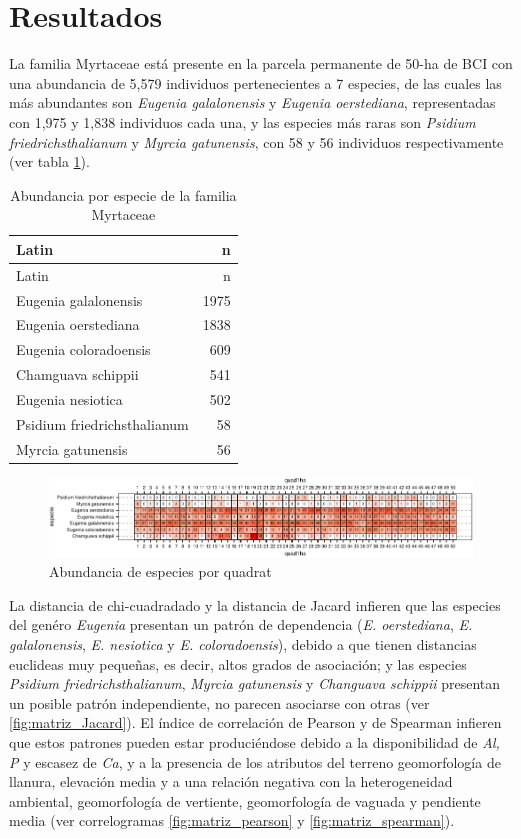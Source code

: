 \documentclass[11pt,]{article}
\begin{document}
\section{Resultados}\label{resultados}

La familia Myrtaceae está presente en la parcela permanente de 50-ha de
BCI con una abundancia de 5,579 individuos pertenecientes a 7 especies,
de las cuales las más abundantes son \emph{Eugenia galalonensis} y
\emph{Eugenia oerstediana}, representadas con 1,975 y 1,838 individuos
cada una, y las especies más raras son \emph{Psidium
friedrichsthalianum} y \emph{Myrcia gatunensis}, con 58 y 56 individuos
respectivamente (ver tabla \ref{tab:abun_sp}).

\begin{longtable}[]{@{}lr@{}}
\caption{\label{tab:abun_sp}Abundancia por especie de la familia
Myrtaceae}\tabularnewline
\toprule
Latin & n\tabularnewline
\midrule
\endfirsthead
\toprule
Latin & n\tabularnewline
\midrule
\endhead
Eugenia galalonensis & 1975\tabularnewline
Eugenia oerstediana & 1838\tabularnewline
Eugenia coloradoensis & 609\tabularnewline
Chamguava schippii & 541\tabularnewline
Eugenia nesiotica & 502\tabularnewline
Psidium friedrichsthalianum & 58\tabularnewline
Myrcia gatunensis & 56\tabularnewline
\bottomrule
\end{longtable}

\begin{figure}
\centering
\includegraphics{manuscrito_files/figure-latex/unnamed-chunk-3-1.pdf}
\caption{\label{fig:abun_sp_q}Abundancia de especies por quadrat}
\end{figure}

La distancia de chi-cuadradado y la distancia de Jacard infieren que las
especies del genéro \emph{Eugenia} presentan un patrón de dependencia
(\emph{E. oerstediana}, \emph{E. galalonensis}, \emph{E. nesiotica} y
\emph{E. coloradoensis}), debido a que tienen distancias euclideas muy
pequeñas, es decir, altos grados de asociación; y las especies
\emph{Psidium friedrichsthalianum}, \emph{Myrcia gatunensis} y
\emph{Changuava schippii} presentan un posible patrón independiente, no
parecen asociarse con otras (ver \ref{fig:matriz_Jacard}). El índice de
correlación de Pearson y de Spearman infieren que estos patrones pueden
estar produciéndose debido a la disponibilidad de \emph{Al, P} y escasez
de \emph{Ca}, y a la presencia de los atributos del terreno
geomorfología de llanura, elevación media y a una relación negativa con
la heterogeneidad ambiental, geomorfología de vertiente, geomorfología
de vaguada y pendiente media (ver correlogramas \ref{fig:matriz_pearson}
y \ref{fig:matriz_spearman}).
\end{document}
